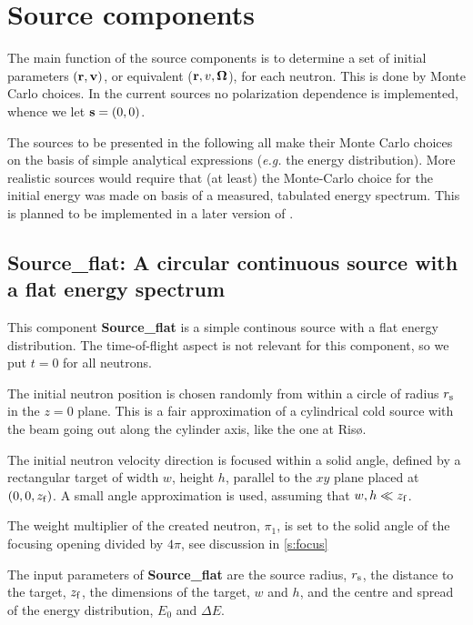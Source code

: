 
\section{Source components}
The main function of the source components is to determine a set of initial
parameters $({\bf r}, {\bf v})$, or equivalent (${\bf r}, v, \mbox{\boldmath $\Omega$} $),
for each neutron. This is done by Monte Carlo choices. 
In the current sources no polarization dependence is implemented, 
whence we let ${\bf s}=(0,0)$.

The sources to be presented in the following all make their Monte Carlo
choices on the basis of simple analytical expressions ({\em e.g.} the
energy distribution). 
More realistic sources would require that (at least) the Monte-Carlo choice
for the initial energy was made on basis of a measured,
tabulated energy spectrum.
This is planned to be implemented in a later version of \MCS .

\subsection{Source\_flat: A circular continuous source with a flat energy spectrum}
\label{sourceaim}
This component {\bf Source\_flat} is 
a simple continous source with a flat energy distribution.
The time-of-flight aspect is not relevant for this component,
so we put $t=0$ for all neutrons.

The initial neutron position is chosen randomly from within a
circle of radius $r_{\rm s}$ in the $z=0$ plane. 
This is a fair approximation
of a cylindrical cold source with the beam going out along
the cylinder axis, like the one at Ris\o .

The initial neutron velocity direction is focused within
a solid angle, defined by a rectangular target of width
$w$, height $h$, parallel to 
the $xy$ plane placed at $(0,0,z_{\rm f})$. 
A small angle approximation is used, assuming that 
$w,h \ll z_{\rm f}$.

The weight multiplier of the created neutron, $\pi_1$, is set to the
solid angle of the focusing opening divided by $4\pi$,
see discussion in \ref{s:focus}

The input parameters of {\bf Source\_flat} are the source radius, $r_{\rm s}$,
the distance to the target, $z_{\rm f}$, 
the dimensions of the target, $w$ and $h$, and
the centre and spread of the energy distribution, $E_0$ and $\Delta E$.


